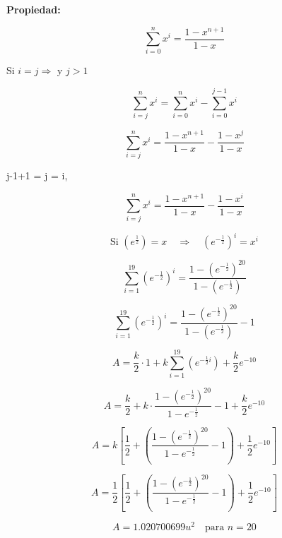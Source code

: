 \textbf{Propiedad:} 

\[
\sum_{i=0}^{n} x^i = \frac{1 - x^{n+1}}{1 - x}
\]

Si $i = j \Rightarrow$ y $j > 1$

\[
\sum_{i=j}^{n} x^i = \sum_{i=0}^{n} x^i - \sum_{i=0}^{j-1} x^i
\]

\[
\sum_{i=j}^{n} x^i = \frac{1 - x^{n+1}}{1 - x} - \frac{1 - x^j}{1 - x}
\]

 j-1+1 = j = i, 

\begin{equation}
\sum_{i=j}^{n} x^i = \frac{1 - x^{n+1}}{1 - x} - \frac{1 - x^i}{1 - x}
\label{eq:sumatoria}
\end{equation}

\[
\text{Si } \left( e^{\frac{1}{2}} \right) = x \quad \Rightarrow \quad \left( e^{-\frac{1}{2}} \right)^i = x^i
\]

\[
\sum_{i=1}^{19} \left( e^{-\frac{1}{2}} \right)^i = \frac{1 - \left(e^{-\frac{1}{2}}\right)^{20}}{1 - \left(e^{-\frac{1}{2}}\right)}
\]

\[
\sum_{i=1}^{19} \left( e^{-\frac{1}{2}} \right)^i = \frac{1 - \left(e^{-\frac{1}{2}}\right)^{20}}{1 - \left(e^{-\frac{1}{2}}\right)} - 1
\]

\[
A = \frac{k}{2} \cdot 1 + k \sum_{i=1}^{19} \left( e^{-\frac{1}{2} i} \right) + \frac{k}{2} e^{-10}
\]

\[
A = \frac{k}{2} + k \cdot \frac{1 - \left(e^{-\frac{1}{2}}\right)^{20}}{1 - e^{-\frac{1}{2}}} - 1 + \frac{k}{2} e^{-10}
\]

\[
A = k \left[ \frac{1}{2} + \left( \frac{1 - \left(e^{-\frac{1}{2}}\right)^{20}}{1 - e^{-\frac{1}{2}}} - 1 \right) + \frac{1}{2} e^{-10} \right]
\]

\[
A = \frac{1}{2} \left[ \frac{1}{2} + \left( \frac{1 - \left(e^{-\frac{1}{2}}\right)^{20}}{1 - e^{-\frac{1}{2}}} - 1 \right) + \frac{1}{2} e^{-10} \right]
\]

\[
A = 1.020700699 u^2 \quad \text{para } n = 20
\]
